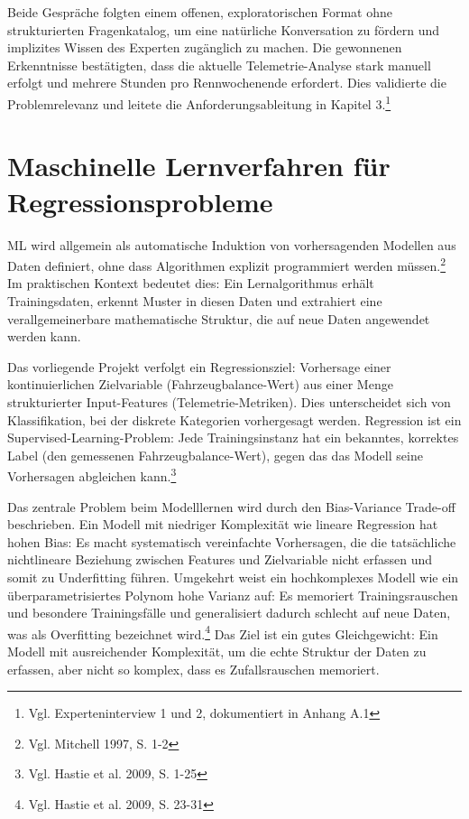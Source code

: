 Beide Gespräche folgten einem offenen, exploratorischen Format ohne strukturierten Fragenkatalog, um eine natürliche Konversation zu fördern und implizites Wissen des Experten zugänglich zu machen. Die gewonnenen Erkenntnisse bestätigten, dass die aktuelle Telemetrie-Analyse stark manuell erfolgt und mehrere Stunden pro Rennwochenende erfordert. Dies validierte die Problemrelevanz und leitete die Anforderungsableitung in Kapitel 3.\footnote{Vgl. Experteninterview 1 und 2, dokumentiert in Anhang A.1} 



\section{Maschinelle Lernverfahren für Regressionsprobleme}

\ac{ML} wird allgemein als automatische Induktion von vorhersagenden Modellen aus Daten definiert, ohne dass Algorithmen explizit programmiert werden müssen.\footnote{Vgl. Mitchell 1997, S. 1-2} Im praktischen Kontext bedeutet dies: Ein Lernalgorithmus erhält Trainingsdaten, erkennt Muster in diesen Daten und extrahiert eine verallgemeinerbare mathematische Struktur, die auf neue Daten angewendet werden kann.

Das vorliegende Projekt verfolgt ein Regressionsziel: Vorhersage einer kontinuierlichen Zielvariable (Fahrzeugbalance-Wert) aus einer Menge strukturierter Input-Features (Telemetrie-Metriken). Dies unterscheidet sich von Klassifikation, bei der diskrete Kategorien vorhergesagt werden. Regression ist ein Supervised-Learning-Problem: Jede Trainingsinstanz hat ein bekanntes, korrektes Label (den gemessenen Fahrzeugbalance-Wert), gegen das das Modell seine Vorhersagen abgleichen kann.\footnote{Vgl. Hastie et al. 2009, S. 1-25}

Das zentrale Problem beim Modelllernen wird durch den Bias-Variance Trade-off beschrieben. Ein Modell mit niedriger Komplexität wie lineare Regression hat hohen Bias: Es macht systematisch vereinfachte Vorhersagen, die die tatsächliche nichtlineare Beziehung zwischen Features und Zielvariable nicht erfassen und somit zu Underfitting führen. Umgekehrt weist ein hochkomplexes Modell wie ein überparametrisiertes Polynom hohe Varianz auf: Es memoriert Trainingsrauschen und besondere Trainingsfälle und generalisiert dadurch schlecht auf neue Daten, was als Overfitting bezeichnet wird.\footnote{Vgl. Hastie et al. 2009, S. 23-31} Das Ziel ist ein gutes Gleichgewicht: Ein Modell mit ausreichender Komplexität, um die echte Struktur der Daten zu erfassen, aber nicht so komplex, dass es Zufallsrauschen memoriert.

